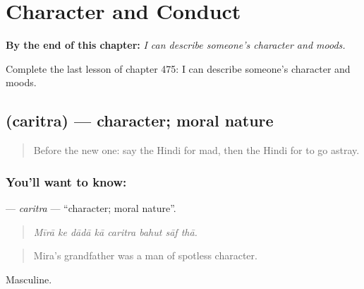 
\chapter{Character and Conduct}
\label{ch:hi-character-and-conduct}

\begin{chapteropening}
\textbf{By the end of this chapter:} \emph{I can describe someone's character and moods.}

Complete the last lesson of chapter 475: I can describe someone's character and moods.
\end{chapteropening}

\section[\texorpdfstring{\hi{चरित्र} (caritra)}{चरित्र (caritra)}]{ (caritra) — character; moral nature}

\label{lesson:HI-C475-caritra}



\begin{quote}
Before the new one: say the Hindi for mad, then the Hindi for to go astray.
\end{quote}

\subsection*{You'll want to know: }
\textbf{} — \emph{caritra} — \textquotedblleft{}character; moral nature\textquotedblright{}.

\begin{quote}
       
\end{quote}

\begin{quote}
\emph{Mīrā ke dādā kā caritra bahut sāf thā.}
\end{quote}

\begin{quote}
Mira's grandfather was a man of spotless character.
\end{quote}

Masculine.

